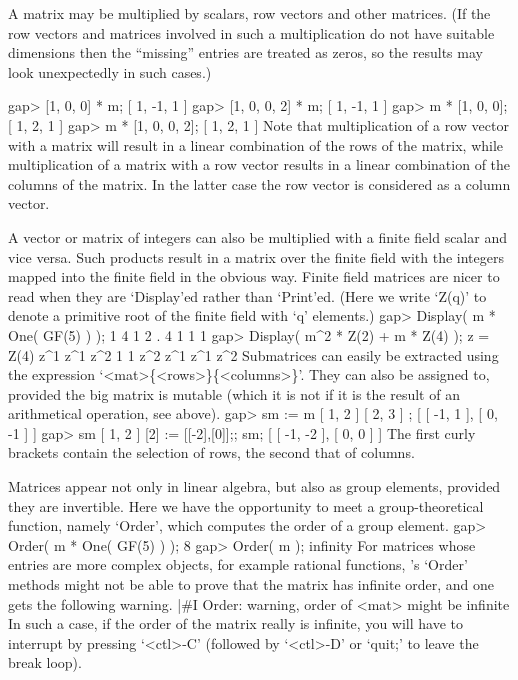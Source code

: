 A matrix may be multiplied by scalars, row vectors and other matrices.
(If the row vectors and matrices involved in such a multiplication do not
have suitable dimensions then the ``missing'' entries are treated as zeros,
so the results may look unexpectedly in such cases.)

\beginexample
gap> [1, 0, 0] * m;
[ 1, -1, 1 ]
gap> [1, 0, 0, 2] * m;
[ 1, -1, 1 ]
gap> m * [1, 0, 0];
[ 1, 2, 1 ]
gap> m * [1, 0, 0, 2];
[ 1, 2, 1 ]
\endexample
Note that multiplication  of a row vector with  a matrix will result in a
linear combination of the  rows of the  matrix, while multiplication of a
matrix with a row  vector results in  a linear combination of the columns
of the  matrix. In  the latter case  the  row vector is considered   as a
column vector.

A vector or matrix of integers can also be multiplied
with a finite field scalar and vice versa.
Such products result in a matrix over the finite field with the integers
mapped into the finite field in the obvious way.
Finite field matrices are nicer to read when they are `Display'ed rather
than `Print'ed.
(Here  we write `Z(q)' to denote a  primitive root of the finite field
with `q' elements.)
\beginexample
gap> Display( m * One( GF(5) ) );
 1 4 1
 2 . 4
 1 1 1
gap> Display( m^2 * Z(2) + m * Z(4) );
z = Z(4)
 z^1 z^1 z^2
   1   1 z^2
 z^1 z^1 z^2
\endexample
Submatrices    can  easily     be    extracted  using    the   expression
`<mat>\{<rows>\}\{<columns>\}'. They   can also be  assigned to, provided
the big matrix  is mutable (which  it is not if it  is  the result of  an
arithmetical operation, see above).
\beginexample
gap> sm := m{ [ 1, 2 ] }{ [ 2, 3 ] };
[ [ -1, 1 ], [ 0, -1 ] ]
gap> sm{ [ 1, 2 ] }{ [2] } := [[-2],[0]];;  sm;
[ [ -1, -2 ], [ 0, 0 ] ]
\endexample
The first curly brackets contain the selection of rows,
the second that of columns.

Matrices appear not only in linear algebra, but also as group elements,
provided they are invertible.
Here we have the opportunity to meet a group-theoretical function,
namely `Order', which computes the order of a group element.
\beginexample
gap> Order( m * One( GF(5) ) );
8
gap> Order( m );
infinity
\endexample
For matrices whose entries are more complex objects, for example rational
functions, {\GAP}'s `Order' methods might not be able to prove that the
matrix has infinite order, and one gets the following warning.
\begintt
|#I  Order: warning, order of <mat> might be infinite
\endtt
In such a case, if the order of the matrix really is infinite, you will
have to interrupt {\GAP} by  pressing `<ctl>-C' (followed by `<ctl>-D' or
`quit;'  to leave the   break loop).

